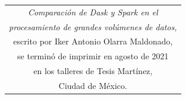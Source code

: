 \documentclass[11pt, oneside]{book}
\begin{document}
\begin{thebibliography}{111}

























\end{thebibliography}

\newpage
\thispagestyle{empty}
\begin{table}[p]
\centering
\small
\label{ed}
\begin{tabular}{c}
\textit{Comparación de Dask y Spark en el} \\ \textit{procesamiento de grandes volúmenes de datos,}\\ escrito por Iker Antonio Olarra Maldonado,\\ se terminó de imprimir en agosto de 2021\\ en los talleres de Tesis Martínez,\\ Ciudad de México.
\end{tabular}
\end{table}


\end{document}
